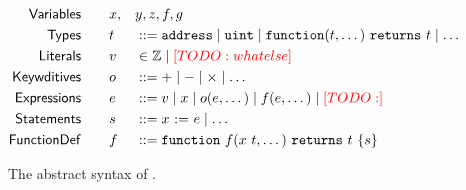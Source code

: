 \begin{figure}
  \begin{alignat*}{3}
    \mathsf{Variables}  \qquad & x,&&y,z,f,g \\
    \mathsf{Types}      \qquad & t && ::=
      \texttt{address} \mid
      \texttt{uint} \mid
      \texttt{function}(t, \dots)~\texttt{returns}~t \mid
      \dots \\
    \mathsf{Literals}    \qquad & v && \in
      \mathbb{Z} \mid
      {\color{red}[TODO: whatelse]} \\
    \mathsf{Keywditives} \qquad & o && ::=
      + \mid
      - \mid
      \times \mid
      \dots \\
    \mathsf{Expressions}\qquad & e && ::=
      v \mid
      x \mid
      o(e, \dots) \mid
      f(e, \dots) \mid
      {\color{red}[TODO: ]} \\
    \mathsf{Statements} \qquad & s && ::=
      x ~\mathsf{:=}~ e \mid
      \dots \\
    \mathsf{Function Def} \qquad & f && ::=
      \texttt{function}~f(x ~ t, \dots)~\texttt{returns}~t~\{ s \}
  \end{alignat*}
  \caption{The abstract syntax of \lang.}
  \label{fig:syntax}
\end{figure}
